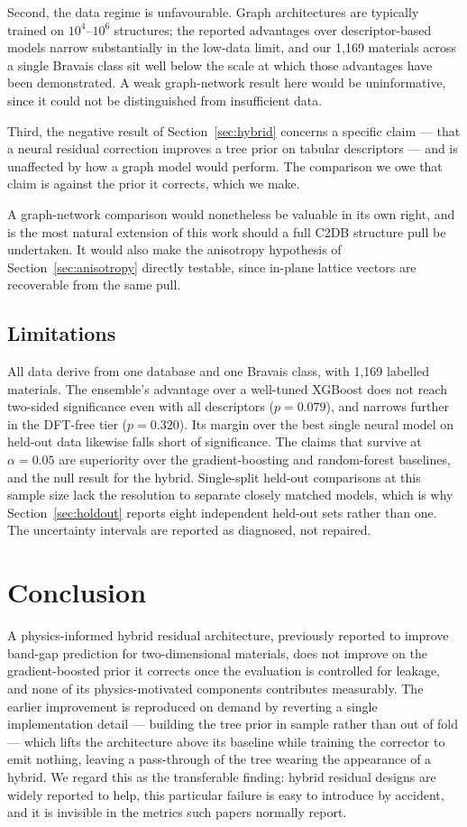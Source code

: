 \documentclass{ieeeaccess}
\begin{document}
Second, the data regime is unfavourable. Graph architectures are typically trained on $10^4$--$10^6$ structures; the reported advantages over descriptor-based models narrow substantially in the low-data limit, and our 1{,}169 materials across a single Bravais class sit well below the scale at which those advantages have been demonstrated. A weak graph-network result here would be uninformative, since it could not be distinguished from insufficient data.

Third, the negative result of Section~\ref{sec:hybrid} concerns a specific claim --- that a neural residual correction improves a tree prior on tabular descriptors --- and is unaffected by how a graph model would perform. The comparison we owe that claim is against the prior it corrects, which we make.

A graph-network comparison would nonetheless be valuable in its own right, and is the most natural extension of this work should a full C2DB structure pull be undertaken. It would also make the anisotropy hypothesis of Section~\ref{sec:anisotropy} directly testable, since in-plane lattice vectors are recoverable from the same pull.

\subsection{Limitations}
All data derive from one database and one Bravais class, with 1{,}169 labelled materials. The ensemble's advantage over a well-tuned XGBoost does not reach two-sided significance even with all descriptors ($p = 0.079$), and narrows further in the DFT-free tier ($p = 0.320$). Its margin over the best single neural model on held-out data likewise falls short of significance. The claims that survive at $\alpha = 0.05$ are superiority over the gradient-boosting and random-forest baselines, and the null result for the hybrid. Single-split held-out comparisons at this sample size lack the resolution to separate closely matched models, which is why Section~\ref{sec:holdout} reports eight independent held-out sets rather than one. The uncertainty intervals are reported as diagnosed, not repaired.

\section{Conclusion}
\label{sec:conclusion}
A physics-informed hybrid residual architecture, previously reported to improve band-gap prediction for two-dimensional materials, does not improve on the gradient-boosted prior it corrects once the evaluation is controlled for leakage, and none of its physics-motivated components contributes measurably. The earlier improvement is reproduced on demand by reverting a single implementation detail --- building the tree prior in sample rather than out of fold --- which lifts the architecture above its baseline while training the corrector to emit nothing, leaving a pass-through of the tree wearing the appearance of a hybrid. We regard this as the transferable finding: hybrid residual designs are widely reported to help, this particular failure is easy to introduce by accident, and it is invisible in the metrics such papers normally report.
\end{document}
